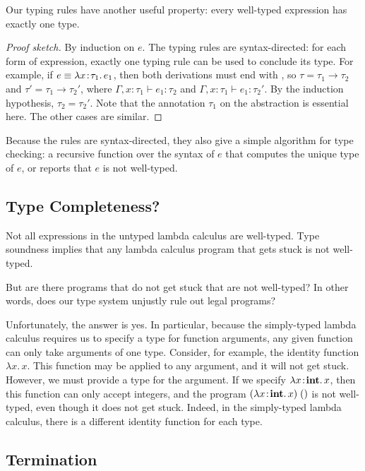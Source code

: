 Our typing rules have another useful property: every well-typed expression has exactly one type.


\begin{proof}[Proof sketch]
By induction on $e$. The typing rules are syntax-directed: for each form of expression, exactly one typing rule can be used to conclude its type. For example, if $e \equiv \lambda x\!:\!\tau_1.\, e_1$, then both derivations must end with , so $\tau = \tau_1 \to \tau_2$ and $\tau' = \tau_1 \to \tau_2'$, where $\Gamma, x:\tau_1 \vdash e_1 : \tau_2$ and $\Gamma, x:\tau_1 \vdash e_1 : \tau_2'$. By the induction hypothesis, $\tau_2 = \tau_2'$. Note that the annotation $\tau_1$ on the abstraction is essential here. The other cases are similar.
\end{proof}

Because the rules are syntax-directed, they also give a simple algorithm for type checking: a recursive function over the syntax of $e$ that computes the unique type of $e$, or reports that $e$ is not well-typed.

\subsection{Type Completeness?}

Not all expressions in the untyped lambda calculus are well-typed. Type soundness implies that any lambda calculus program that gets stuck is not well-typed.

But are there programs that do not get stuck that are not well-typed? In other words, does our type system unjustly rule out legal programs?

Unfortunately, the answer is yes. In particular, because the simply-typed lambda calculus requires us to specify a type for function arguments, any given function can only take arguments of one type. Consider, for example, the identity function $\lambda x.\, x$. This function may be applied to any argument, and it will not get stuck. However, we must provide a type for the argument. If we specify $\lambda x\!:\!\mathbf{int}.\, x$, then this function can only accept integers, and the program $(\lambda x\!:\!\mathbf{int}.\, x)\; ()$ is not well-typed, even though it does not get stuck. Indeed, in the simply-typed lambda calculus, there is a different identity function for each type.

\subsection{Termination}


